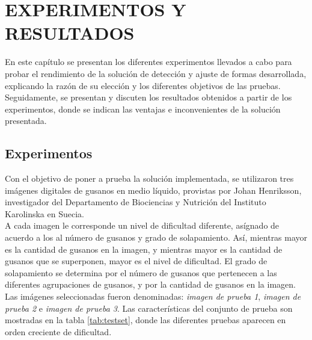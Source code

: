 \thispagestyle{empty}
\cleardoublepage
\chapter{EXPERIMENTOS Y RESULTADOS}
\label{chap:experiments}


En este cap\'itulo se presentan los diferentes experimentos llevados a cabo
para probar el rendimiento de la soluci\'on de detecci\'on y ajuste de formas
desarrollada, explicando la raz\'on de su elecci\'on y los diferentes objetivos
de las pruebas. Seguidamente, se presentan y discuten los resultados obtenidos a
partir de los experimentos, donde se indican las ventajas e inconvenientes 
de la soluci\'on presentada.

\section{Experimentos}
\label{sec:experiments}

Con el objetivo de poner a prueba la soluci\'on implementada, se utilizaron tres im\'agenes
digitales de gusanos en medio l\'iquido, provistas por Johan Henriksson, investigador del
Departamento de Biociencias y Nutrici\'on del Instituto Karolinska en Suecia.\\

A cada imagen le corresponde un nivel de dificultad diferente, as\'ignado de acuerdo a los
al n\'umero de gusanos y grado de solapamiento. As\'i, mientras mayor es la cantidad
de gusanos en la imagen, y mientras mayor es la cantidad de gusanos que se superponen, 
mayor es el nivel de dificultad. El grado de solapamiento se determina por el n\'umero
de gusanos que pertenecen a las diferentes agrupaciones de gusanos, y por la cantidad
de gusanos en la imagen.\\

Las im\'agenes seleccionadas fueron denominadas: \emph{imagen de prueba 1}, \emph{imagen de prueba 2} e
\emph{imagen de prueba 3}. Las caracter\'isticas del conjunto de prueba son mostradas en la tabla \ref{tab:testset}, donde
las diferentes pruebas aparecen en orden creciente de dificultad.


